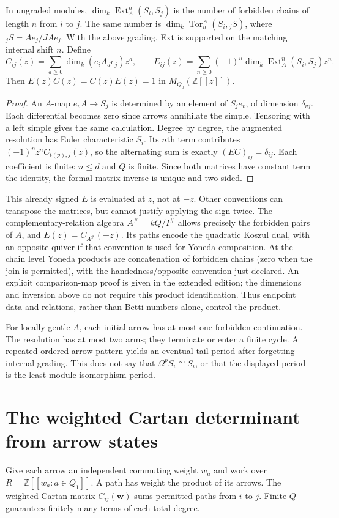\begin{corollary}\label{cor:euler}
In ungraded modules, $\dim_k\operatorname{Ext}^n_A(S_i,S_j)$ is the number of forbidden chains of length $n$ from $i$ to $j$. The same number is $\dim_k\operatorname{Tor}^A_n(S_i,{}_jS)$, where ${}_jS=Ae_j/JAe_j$. With the above grading, Ext is supported on the matching internal shift $n$. Define
\[
 C_{ij}(z)=\sum_{d\geq0}\dim_k(e_iA_de_j)z^d,\qquad
 E_{ij}(z)=\sum_{n\geq0}(-1)^n\dim_k\operatorname{Ext}^n_A(S_i,S_j)z^n.
\]
Then $E(z)C(z)=C(z)E(z)=1$ in $M_{Q_0}(\mathbb Z[[z]])$.
\end{corollary}
\begin{proof}
An $A$-map $e_vA\to S_j$ is determined by an element of $S_je_v$, of dimension $\delta_{vj}$. Each differential becomes zero since arrows annihilate the simple. Tensoring with a left simple gives the same calculation. Degree by degree, the augmented resolution has Euler characteristic $S_i$. Its $n$th term contributes $(-1)^nz^nC_{t(p),j}(z)$, so the alternating sum is exactly $(EC)_{ij}=\delta_{ij}$. Each coefficient is finite: $n\leq d$ and $Q$ is finite. Since both matrices have constant term the identity, the formal matrix inverse is unique and two-sided.
\end{proof}

This already signed $E$ is evaluated at $z$, not at $-z$. Other conventions can transpose the matrices, but cannot justify applying the sign twice. The complementary-relation algebra $A^\#=kQ/I^\#$ allows precisely the forbidden pairs of $A$, and $E(z)=C_{A^\#}(-z)$. Its paths encode the quadratic Koszul dual, with an opposite quiver if that convention is used for Yoneda composition. At the chain level Yoneda products are concatenation of forbidden chains (zero when the join is permitted), with the handedness/opposite convention just declared. An explicit comparison-map proof is given in the extended edition; the dimensions and inversion above do not require this product identification. Thus endpoint data and relations, rather than Betti numbers alone, control the product.

For locally gentle $A$, each initial arrow has at most one forbidden continuation. The resolution has at most two arms; they terminate or enter a finite cycle. A repeated ordered arrow pattern yields an eventual tail period after forgetting internal grading. This does not say that $\Omega^pS_i\cong S_i$, or that the displayed period is the least module-isomorphism period.

\section{The weighted Cartan determinant from arrow states}
Give each arrow an independent commuting weight $w_a$ and work over $R=\mathbb Z[[w_a:a\in Q_1]]$. A path has weight the product of its arrows. The weighted Cartan matrix $C_{ij}(\mathbf w)$ sums permitted paths from $i$ to $j$. Finite $Q$ guarantees finitely many terms of each total degree.

